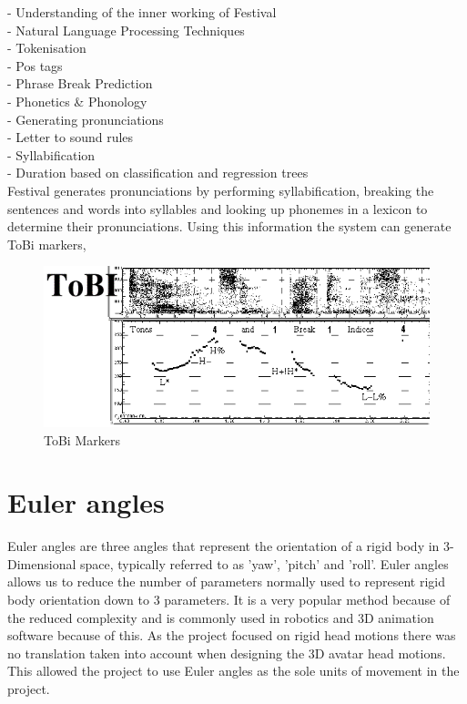 \documentclass[bsc,frontabs,twoside,singlespacing,parskip]{infthesis}
\begin{document}
- Understanding of the inner working of Festival \\
- Natural Language Processing Techniques \\
- Tokenisation \\
- Pos tags \\
- Phrase Break Prediction \\
- Phonetics \& Phonology \\
- Generating pronunciations \\
- Letter to sound rules\\
- Syllabification\\
- Duration based on classification and regression trees \\
Festival generates pronunciations by performing syllabification, breaking the sentences and words into syllables and looking up phonemes in a lexicon to determine their pronunciations. Using this information the system can generate ToBi markers, 

\begin{figure}[h!]
	\centering
	\includegraphics[width=1\textwidth]{tobi.png}
	\caption{ToBi Markers}
\end{figure}

\section{Euler angles}

Euler angles are three angles that represent the orientation of a rigid body in 3-Dimensional space, typically referred to as 'yaw', 'pitch' and 'roll'. Euler angles allows us to reduce the number of parameters normally used to represent rigid body orientation down to 3 parameters. It is a very popular method because of the reduced complexity and is commonly used in robotics and 3D animation software because of this. As the project focused on rigid head motions there was no translation taken into account when designing the 3D avatar head motions. This allowed the project to use Euler angles as the sole units of movement in the project.
\end{document}
